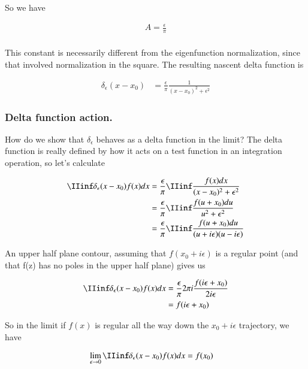 So we have

\begin{align*}
A = \frac{\epsilon }{\pi} \\
\end{align*}

This constant is necessarily different from the eigenfunction normalization, since that involved normalization in the square.  The resulting 
nascent delta function is

\begin{align*}
\delta_\epsilon(x - x_0) &= \frac{\epsilon }{\pi} \frac{1}{(x-x_0)^2 + \epsilon^2}
\end{align*}

\subsubsection{Delta function action. }

How do we show that $\delta_\epsilon$ behaves as a delta function in the limit?  The delta function is really defined by how it
acts on a test function in an integration operation, so let's calculate 

\begin{align*}
\IIinf \delta_\epsilon(x - x_0) f(x) dx 
&=
\frac{\epsilon }{\pi} \IIinf \frac{f(x) dx}{(x-x_0)^2 + \epsilon^2} \\
&=
\frac{\epsilon }{\pi} \IIinf \frac{f(u + x_0) du}{u^2 + \epsilon^2} \\
&=
\frac{\epsilon }{\pi} \IIinf \frac{f(u + x_0) du}{(u + i \epsilon)(u - i \epsilon)} \\
\end{align*}

An upper half plane contour, assuming that $f(x_0 + i\epsilon)$ is a regular point (and that f(z) has no poles in the upper half plane) gives us

\begin{align*}
\IIinf \delta_\epsilon(x - x_0) f(x) dx 
&=
\frac{\epsilon }{\pi} 2 \pi i \frac{f(i \epsilon + x_0) }{2 i \epsilon} \\
&=
f(i \epsilon + x_0)
\end{align*}

So in the limit if $f(x)$ is regular all the way down the $x_0 + i\epsilon$ trajectory, we have

\begin{align*}
\lim_{\epsilon \rightarrow 0} \IIinf \delta_\epsilon(x - x_0) f(x) dx &= f(x_0)
\end{align*}

